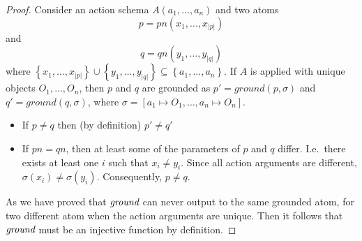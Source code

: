\documentclass[../Master.tex]{subfiles}
\begin{document}
\begin{proof}
    Consider an action schema $A\left(a_1, \dots, a_n\right)$ and two atoms 
    \begin{equation*}
        p = pn\left(x_1, \dots, x_{|p|}\right)
    \end{equation*}
    and
    \begin{equation*}
        q = qn\left(y_1, \dots, y_{|q|}\right)
    \end{equation*}
    where $\left\{ x_1, \dots, x_{|p|}\right\} \cup \left\{ y_1, \dots, y_{|q|}\right\} \subseteq \left\{a_1, \dots, a_n\right\}$. If $A$ is applied with unique objects $O_1, \dots, O_n$, then $p$ and $q$ are grounded as $p' = ground(p, \sigma)$ and $q' = ground(q,\sigma)$, where $\sigma = \left[ a_1 \mapsto O_1, \dots, a_n \mapsto O_n \right]$.

	\begin{itemize}
		\item If $p \neq q$ then (by definition) $p' \neq q'$
		
        \item If $pn = qn$, then at least some of the parameters of $p$ and $q$ differ. I.e.\ there exists at least one $i$ such that $x_i \neq y_i$. Since all action arguments are different, $\sigma\left( x_i \right) \neq \sigma\left( y_i \right)$. Consequently, $p \neq q$.
	\end{itemize}	
	As we have proved that $\textit{ground}$ can never output to the same grounded atom, for two different atom when the action arguments are unique. Then it follows that $\textit{ground}$ must be an injective function by definition.
\end{proof}
\end{document}
